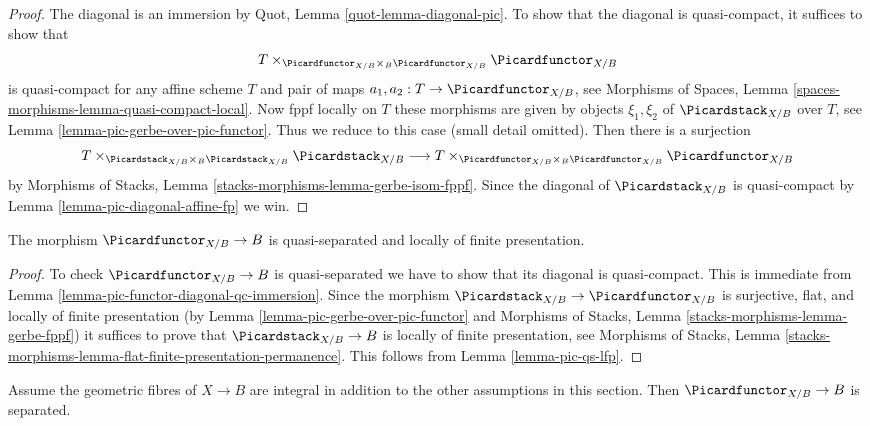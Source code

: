 \begin{proof}
The diagonal is an immersion by Quot, Lemma \ref{quot-lemma-diagonal-pic}.
To show that the diagonal is quasi-compact, it suffices to show that
$$
T \times_{\Picardfunctor_{X/B} \times_B \Picardfunctor_{X/B}}
\Picardfunctor_{X/B}
$$
is quasi-compact for any affine scheme $T$ and pair of maps
$a_1, a_2 : T \to \Picardfunctor_{X/B}$, see
Morphisms of Spaces, Lemma \ref{spaces-morphisms-lemma-quasi-compact-local}.
Now fppf locally on $T$ these morphisms are given by objects
$\xi_1, \xi_2$ of $\Picardstack_{X/B}$ over $T$,
see Lemma \ref{lemma-pic-gerbe-over-pic-functor}.
Thus we reduce to this case (small detail omitted).
Then there is a surjection
$$
T \times_{\Picardstack_{X/B} \times_B \Picardstack_{X/B}}
\Picardstack_{X/B}
\longrightarrow
T \times_{\Picardfunctor_{X/B} \times_B \Picardfunctor_{X/B}}
\Picardfunctor_{X/B}
$$
by Morphisms of Stacks, Lemma \ref{stacks-morphisms-lemma-gerbe-isom-fppf}.
Since the diagonal of $\Picardstack_{X/B}$ is quasi-compact
by Lemma \ref{lemma-pic-diagonal-affine-fp}
we win.
\end{proof}

\begin{lemma}
\label{lemma-pic-functor-qs-lfp}
The morphism $\Picardfunctor_{X/B} \to B$ is quasi-separated and
locally of finite presentation.
\end{lemma}

\begin{proof}
To check $\Picardfunctor_{X/B} \to B$ is quasi-separated we have to
show that its diagonal is quasi-compact. This is immediate from
Lemma \ref{lemma-pic-functor-diagonal-qc-immersion}.
Since the morphism $\Picardstack_{X/B} \to \Picardfunctor_{X/B}$
is surjective, flat, and locally of finite presentation
(by Lemma \ref{lemma-pic-gerbe-over-pic-functor} and
Morphisms of Stacks, Lemma \ref{stacks-morphisms-lemma-gerbe-fppf})
it suffices to prove that $\Picardstack_{X/B} \to B$
is locally of finite presentation, see
Morphisms of Stacks, Lemma
\ref{stacks-morphisms-lemma-flat-finite-presentation-permanence}.
This follows
from Lemma \ref{lemma-pic-qs-lfp}.
\end{proof}

\begin{lemma}
\label{lemma-pic-functor-uniqueness-part}
Assume the geometric fibres of $X \to B$ are integral
in addition to the other assumptions in this section.
Then $\Picardfunctor_{X/B} \to B$ is separated.
\end{lemma}

